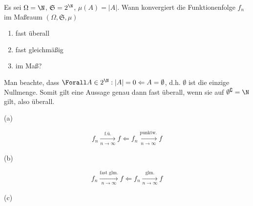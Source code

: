 
\begin{exercise}

Es sei $\Omega = \N$, $\mathfrak{S} = 2^\N$, $\mu(A) = |A|$. Wann konvergiert die Funktionenfolge $f_n$ im Maßraum $(\Omega, \mathfrak{S}, \mu)$

\begin{enumerate}[label = (\alph*)]

  \item
  fast überall
  
  \item
  fast gleichmäßig
  
  \item
  im Maß?

\end{enumerate}

\end{exercise}


\begin{solution}

Man beachte, dass $\Forall A \in 2^\N: |A| = 0 \Leftarrow A = \emptyset$, d.h. $\emptyset$ ist die einzige Nullmenge. Somit gilt eine Aussage genau dann fast überall, wenn sie auf $\emptyset^\complement = \N$ gilt, also überall.

(a)

\begin{align*}
  f_n \xrightarrow[n \to \infty]{\text{f.ü.}} f
  \Leftarrow
  f_n \xrightarrow[n \to \infty]{\text{punktw.}} f
\end{align*}

(b)

\begin{align*}
  f_n \xrightarrow[n \to \infty]{\text{fast glm.}} f
  \Leftarrow
  f_n \xrightarrow[n \to \infty]{\text{glm.}} f
\end{align*}

(c)

\end{solution}

